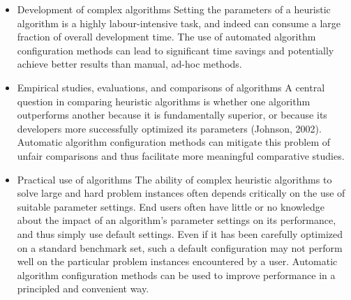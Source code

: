 \documentclass{article}
\begin{document}
{\begin{itemize}	
	\item Development of complex algorithms 
	Setting the parameters of a heuristic algorithm is a highly labour-intensive task, and indeed can consume a large fraction of overall development time. The use of automated algorithm configuration methods can lead to significant time savings and potentially achieve better results than manual, ad-hoc methods.
	\item Empirical studies, evaluations, and comparisons of algorithms 
	A central question in comparing heuristic algorithms is whether one algorithm outperforms another because it is fundamentally superior, or because its developers more successfully optimized its parameters (Johnson, 2002). Automatic algorithm configuration methods can mitigate this problem of unfair comparisons and thus facilitate more meaningful comparative studies.
	\item Practical use of algorithms 
	The ability of complex heuristic algorithms to solve large and hard problem instances often depends critically on the use of suitable parameter settings. End users often have little or no knowledge about the impact of an algorithm’s parameter settings on its performance, and thus simply use default settings. Even if it has been carefully optimized on a standard benchmark set, such a default configuration may not perform well on the particular problem instances encountered by a user. Automatic algorithm configuration methods can be used to improve performance in a principled and convenient way.
\end{itemize}
}
\end{document}

